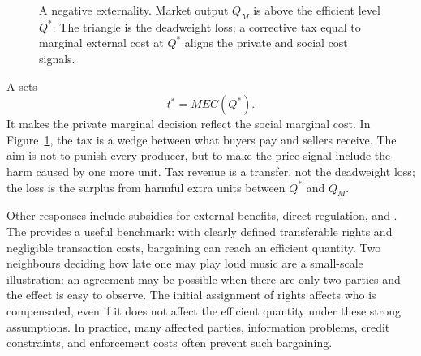 \begin{figure}[htbp]
  \centering
  \caption{A negative externality. Market output $Q_M$ is above the efficient
  level $Q^*$. The triangle is the deadweight loss; a corrective tax equal to
  marginal external cost at $Q^*$ aligns the private and social cost signals.}
  \label{fig:negative-externality}
\end{figure}
\FloatBarrier

A  sets
\[
t^*=MEC(Q^*).
\]
It makes the private marginal decision reflect the social marginal cost. In
Figure~\ref{fig:negative-externality}, the tax is a wedge between what buyers
pay and sellers receive. The aim is not to punish every producer, but to make
the price signal include the harm caused by one more unit. Tax revenue is a
transfer, not the deadweight loss; the loss is the surplus from harmful extra
units between $Q^*$ and $Q_M$.

Other responses include subsidies for external benefits, direct regulation,
and . The  provides a useful
benchmark: with clearly defined transferable rights and negligible transaction
costs, bargaining can reach an efficient quantity. Two neighbours deciding
how late one may play loud music are a small-scale illustration: an agreement
may be possible when there are only two parties and the effect is easy to
observe. The initial assignment of rights affects who is compensated, even if
it does not affect the efficient quantity under these strong assumptions. In
practice, many affected parties, information problems, credit constraints, and
enforcement costs often prevent such bargaining.


